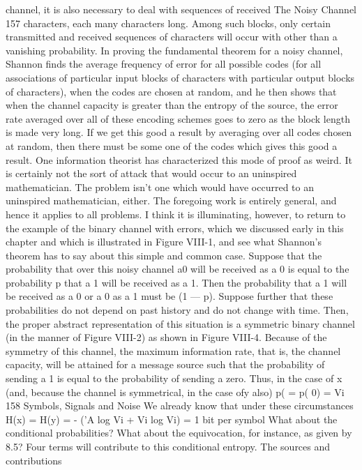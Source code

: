 {{{{{{{{{channel, it is also necessary to deal with sequences of received
The Noisy Channel
157
characters, each many characters long. Among such blocks, only
certain transmitted and received sequences of characters will occur
with other than a vanishing probability.
In proving the fundamental theorem for a noisy channel, Shannon
finds the average frequency of error for all possible codes (for
all associations of particular input blocks of characters with particular
output blocks of characters), when the codes are chosen at
random, and he then shows that when the channel capacity is
greater than the entropy of the source, the error rate averaged over
all of these encoding schemes goes to zero as the block length is
made very long. If we get this good a result by averaging over all
codes chosen at random, then there must be some one of the codes
which gives this good a result. One information theorist has characterized
this mode of proof as weird. It is certainly not the sort
of attack that would occur to an uninspired mathematician. The
problem isn’t one which would have occurred to an uninspired
mathematician, either.
The foregoing work is entirely general, and hence it applies to
all problems. I think it is illuminating, however, to return to the
example of the binary channel with errors, which we discussed
early in this chapter and which is illustrated in Figure VIII-1, and
see what Shannon’s theorem has to say about this simple and
common case.
Suppose that the probability that over this noisy channel a0 will
be received as a 0 is equal to the probability p that a 1 will be
received as a 1. Then the probability that a 1 will be received as a
0 or a 0 as a 1 must be (1 — p). Suppose further that these probabilities
do not depend on past history and do not change with
time. Then, the proper abstract representation of this situation is
a symmetric binary channel (in the manner of Figure VIII-2) as
shown in Figure VIII-4.
Because of the symmetry of this channel, the maximum information
rate, that is, the channel capacity, will be attained for a
message source such that the probability of sending a 1 is equal
to the probability of sending a zero. Thus, in the case of x (and,
because the channel is symmetrical, in the case ofy also)
p(\) = p( 0) = Vi
158
Symbols, Signals and Noise
We already know that under these circumstances
H(x) = H(y)
= - ('A log Vi + Vi log Vi)
= 1 bit per symbol
What about the conditional probabilities? What about the
equivocation, for instance, as given by 8.5? Four terms will contribute
to this conditional entropy. The sources and contributions
}}}}}}}}}
